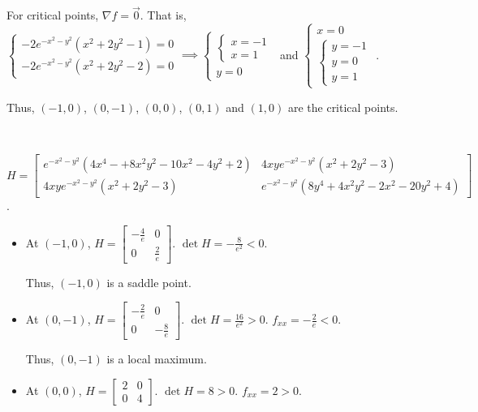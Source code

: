 \begin{enumerate}
    For critical points, $\nabla f = \vec{0}$. That is, $\begin{cases} -2e^{-x^2-y^2} (x^2 + 2y^2 - 1) = 0 \\ -2e^{-x^2-y^2} (x^2 + 2y^2 - 2) = 0 \end{cases} \implies \begin{cases} \begin{cases} x = -1 \\ x = 1 \end{cases} \\ y = 0 \end{cases}$ and $\begin{cases} x = 0 \\ \begin{cases} y = -1 \\ y = 0 \\ y = 1 \end{cases} \end{cases}$.

    Thus, $(-1, 0)$, $(0, -1)$, $(0, 0)$, $(0, 1)$ and $(1, 0)$ are the critical points. 

    {~~~}

    $H = \begin{bmatrix} e^{-x^2-y^2} (4x^4 - + 8x^2y^2 - 10x^2 - 4y^2 + 2) & 4xye^{-x^2-y^2}(x^2 + 2y^2 - 3) \\ 4xye^{-x^2-y^2} (x^2 + 2y^2 - 3) & e^{-x^2-y^2} (8y^4 + 4x^2y^2 - 2x^2 - 20y^2 + 4) \end{bmatrix}$. 

    \begin{itemize}
        \item At $(-1, 0)$, $H = \begin{bmatrix} -\frac{4}{e} & 0 \\ 0 & \frac{2}{e} \end{bmatrix}$. $\det H = -\frac{8}{e^2} < 0$. 
        
        Thus, $(-1, 0)$ is a saddle point. 

        \item At $(0, -1)$, $H = \begin{bmatrix} -\frac{2}{e} & 0 \\ 0 & -\frac{8}{e} \end{bmatrix}$. $\det H = \frac{16}{e^2} > 0$. $f_{xx} = -\frac{2}{e} < 0$. 
        
        Thus, $(0, -1)$ is a local maximum. 

        \item At $(0, 0)$, $H = \begin{bmatrix} 2 & 0 \\ 0 & 4 \end{bmatrix}$. $\det H = 8 > 0$. $f_{xx} = 2 > 0$. 
        

\end{itemize}
\end{enumerate}
